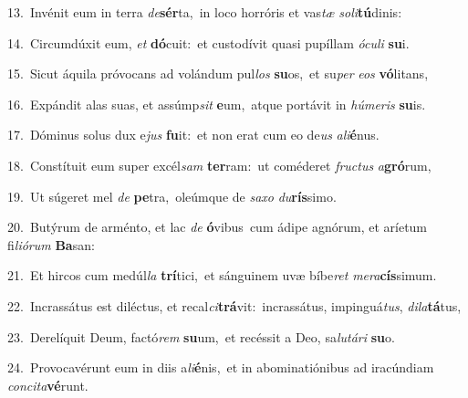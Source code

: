 {\numbfont\textcolor{\numbcolor}{13.}}~Invénit eum in terra \textit{de}\-\textbf{sér}ta,~\star in loco horróris et vas\textit{tæ} \textit{so}\-\textit{li}\textbf{tú}dinis:\par
{\numbfont\textcolor{\numbcolor}{14.}}~Circumdúxit eum, \textit{et} \textbf{dó}\-cuit:~\star et custodívit quasi pupíllam \textit{ó}\-\textit{cu}\textit{li} \textbf{su}\-i.\par
{\numbfont\textcolor{\numbcolor}{15.}}~Sicut áquila próvocans ad volándum pul\textit{los} \textbf{su}\-os,~\star et su\textit{per} \textit{e}\-\textit{os} \textbf{vó}\-litans,\par
{\numbfont\textcolor{\numbcolor}{16.}}~Expándit alas suas, et assúmp\textit{sit} \textbf{e}\-um,~\star atque portávit in \textit{hú}\-\textit{me}\textit{ris} \textbf{su}\-is.\par
{\numbfont\textcolor{\numbcolor}{17.}}~Dóminus solus dux e\textit{jus} \textbf{fu}\-it:~\star et non erat cum eo de\textit{us} \textit{a}\-\textit{li}\textbf{é}nus.\par
{\numbfont\textcolor{\numbcolor}{18.}}~Constítuit eum super excél\textit{sam} \textbf{ter}\-ram:~\star ut coméderet \textit{fruc}\-\textit{tus} \textit{a}\-\textbf{gró}rum,\par
{\numbfont\textcolor{\numbcolor}{19.}}~Ut súgeret mel \textit{de} \textbf{pe}\-tra,~\star oleúmque de \textit{sa}\-\textit{xo} \textit{du}\-\textbf{rís}simo.\par
{\numbfont\textcolor{\numbcolor}{20.}}~Butýrum de arménto, et lac \textit{de} \textbf{ó}\-vibus~\star cum ádipe agnórum, et aríetum fi\-\textit{li}\-\textit{ó}\textit{rum} \textbf{Ba}\-san:\par
{\numbfont\textcolor{\numbcolor}{21.}}~Et hircos cum medúl\textit{la} \textbf{trí}\-tici,~\star et sánguinem uvæ bíbe\textit{ret} \textit{me}\-\textit{ra}\textbf{cís}simum.\par
{\numbfont\textcolor{\numbcolor}{22.}}~Incrassátus est diléctus, et recal\-\textit{ci}\-\textbf{trá}vit:~\star incrassátus, impinguá\-\textit{tus}\-, \textit{di}\-\textit{la}\textbf{tá}tus,\par
{\numbfont\textcolor{\numbcolor}{23.}}~Derelíquit Deum, factó\textit{rem} \textbf{su}\-um,~\star et recéssit a Deo, sa\-\textit{lu}\-\textit{tá}\textit{ri} \textbf{su}\-o.\par
{\numbfont\textcolor{\numbcolor}{24.}}~Provocavérunt eum in diis a\-\textit{li}\-\textbf{é}nis,~\star et in abominatiónibus ad iracúndiam \textit{con}\-\textit{ci}\textit{ta}\textbf{vé}runt.\par
